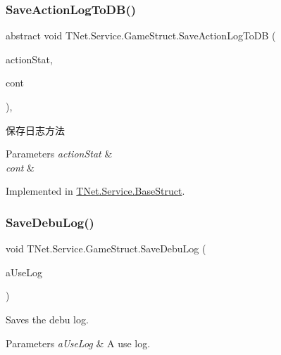 \subsubsection{\texorpdfstring{Save\+Action\+Log\+To\+D\+B()}{SaveActionLogToDB()}}
{\footnotesize\ttfamily abstract void T\+Net.\+Service.\+Game\+Struct.\+Save\+Action\+Log\+To\+DB (\begin{DoxyParamCaption}\item[{\mbox{\hyperlink{class_t_net_1_1_service_1_1_game_struct_ac7fb463ce72bdf0b12b015c74d2d58da}{Log\+Action\+Stat}}}]{action\+Stat,  }\item[{string}]{cont }\end{DoxyParamCaption})\hspace{0.3cm}{\ttfamily [protected]}, {}}



保存日志方法 


\begin{DoxyParams}{Parameters}
{\em action\+Stat} & \\
\hline
{\em cont} & \\
\hline
\end{DoxyParams}


Implemented in \mbox{\hyperlink{class_t_net_1_1_service_1_1_base_struct_ad194547c2bd8ffe7e438af37457b011a}{T\+Net.\+Service.\+Base\+Struct}}.

\mbox{\label{class_t_net_1_1_service_1_1_game_struct_ae091434de292dd9294e2bdf950ef3c55}} 
\subsubsection{\texorpdfstring{Save\+Debu\+Log()}{SaveDebuLog()}}
{\footnotesize\ttfamily void T\+Net.\+Service.\+Game\+Struct.\+Save\+Debu\+Log (\begin{DoxyParamCaption}\item[{String}]{a\+Use\+Log }\end{DoxyParamCaption})\hspace{0.3cm}{\ttfamily [protected]}}



Saves the debu log. 


\begin{DoxyParams}{Parameters}
{\em a\+Use\+Log} & A use log.\\
\hline
\end{DoxyParams}
\mbox{\label{class_t_net_1_1_service_1_1_game_struct_acf020d2386804787d7fff55bbd1c8acf}} 
